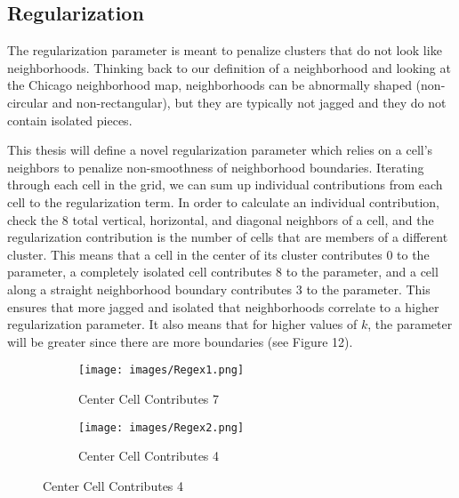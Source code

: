 \documentclass[times new roman,12pt]{article}
\begin{document}
\subsection{Regularization}
\label{sec:reg}

The regularization parameter is meant to penalize clusters that do not look like neighborhoods. Thinking back to our definition of a neighborhood and looking at the Chicago neighborhood map, neighborhoods can be abnormally shaped (non-circular and non-rectangular), but they are typically not jagged and they do not contain isolated pieces.

This thesis will define a novel regularization parameter which relies on a cell's neighbors to penalize non-smoothness of neighborhood boundaries. Iterating through each cell in the grid, we can sum up individual contributions from each cell to the regularization term. In order to calculate an individual contribution, check the 8 total vertical, horizontal, and diagonal neighbors of a cell, and the regularization contribution is the number of cells that are members of a different cluster. This means that a cell in the center of its cluster contributes 0 to the parameter, a completely isolated cell contributes 8 to the parameter, and a cell along a straight neighborhood boundary contributes 3 to the parameter. This ensures that more jagged and isolated that neighborhoods correlate to a higher regularization parameter. It also means that for higher values of $k$, the parameter will be greater since there are more boundaries (see Figure 12). 

\vspace{4mm}

\begin{figure}[H]
\centering
\caption{Illustrative Examples: Colored Neighborhood Identities}
\begin{subfigure}[t]{.35\textwidth}
\centering
  \texttt{[image: images/Regex1.png]}
  \caption{Center Cell Contributes 7}
  \label{fig:regex1}
\end{subfigure}%
\begin{subfigure}[t]{.35\textwidth}
\centering
  \texttt{[image: images/Regex2.png]}
  \caption{Center Cell Contributes 4}
  \label{fig:regex2}
\end{subfigure}%
\end{figure}
\end{document}
